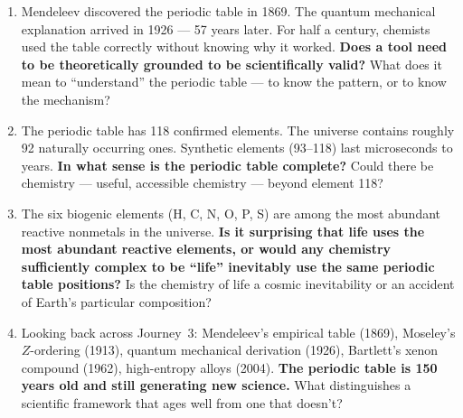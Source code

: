 \documentclass[12pt, a4paper]{book}
\begin{document}
\begin{reflectionbox}
\begin{enumerate}[label=\textbf{R\arabic*.}]
  \item Mendeleev discovered the periodic table in 1869.
        The quantum mechanical explanation arrived in 1926 ---
        57 years later.
        For half a century, chemists used the table
        correctly without knowing why it worked.
        \textbf{Does a tool need to be theoretically grounded
        to be scientifically valid?}
        What does it mean to ``understand'' the periodic table
        --- to know the pattern, or to know the mechanism?

  \item The periodic table has 118 confirmed elements.
        The universe contains roughly 92 naturally occurring ones.
        Synthetic elements (93--118) last microseconds to years.
        \textbf{In what sense is the periodic table complete?}
        Could there be chemistry --- useful, accessible chemistry ---
        beyond element 118?

  \item The six biogenic elements (H, C, N, O, P, S) are
        among the most abundant reactive nonmetals in the universe.
        \textbf{Is it surprising that life uses the most
        abundant reactive elements, or would any chemistry
        sufficiently complex to be ``life'' inevitably
        use the same periodic table positions?}
        Is the chemistry of life a cosmic inevitability
        or an accident of Earth's particular composition?

  \item Looking back across Journey~3:
        Mendeleev's empirical table (1869),
        Moseley's $Z$-ordering (1913),
        quantum mechanical derivation (1926),
        Bartlett's xenon compound (1962),
        high-entropy alloys (2004).
        \textbf{The periodic table is 150 years old and
        still generating new science.}
        What distinguishes a scientific framework that ages
        well from one that doesn't?
\end{enumerate}
\end{reflectionbox}
\end{document}
